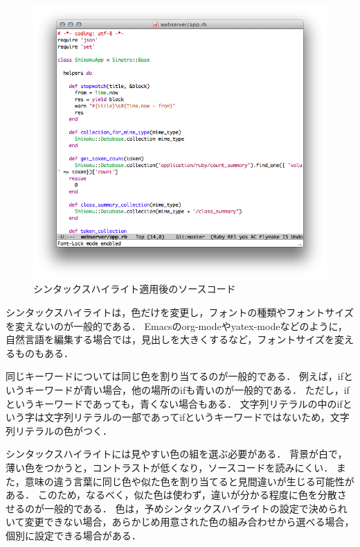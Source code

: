\documentclass{cs-thesis}
\begin{document}
  \begin{figure}[t]
   \centering
   \includegraphics[scale=0.6]{emacs-with-syntax-highlight.png}
   \caption{シンタックスハイライト適用後のソースコード}
   \label{emacs-with-syntax-highlight}
  \end{figure}



  シンタックスハイライトは，色だけを変更し，フォントの種類やフォントサイズを変えないのが一般的である．
  Emacsのorg-mode\cite{bib:emacs-org}やyatex-mode\cite{bib:emacs-yatex}などのように，自然言語を編集する場合では，見出しを大きくするなど，フォントサイズを変えるものもある．

  同じキーワードについては同じ色を割り当てるのが一般的である．
  例えば，ifというキーワードが青い場合，他の場所のifも青いのが一般的である．
  ただし，ifというキーワードであっても，青くない場合もある．
  文字列リテラルの中のifという字は文字列リテラルの一部であってifというキーワードではないため，文字列リテラルの色がつく．

  シンタックスハイライトには見やすい色の組を選ぶ必要がある．
  背景が白で，薄い色をつかうと，コントラストが低くなり，ソースコードを読みにくい．
  また，意味の違う言葉に同じ色や似た色を割り当てると見間違いが生じる可能性がある．
  このため，なるべく，似た色は使わず，違いが分かる程度に色を分散させるのが一般的である．
  色は，予めシンタックスハイライトの設定で決められいて変更できない場合，あらかじめ用意された色の組み合わせから選べる場合，個別に設定できる場合がある．
\end{document}
